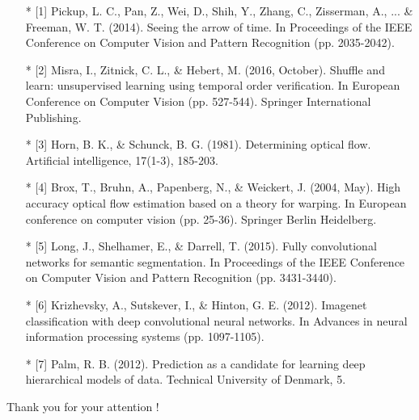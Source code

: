 \documentclass[10pt,a4paper]{report}
\begin{document}
		\scriptsize{
		\begin{itemize}
			
			\item[*] [1] Pickup, L. C., Pan, Z., Wei, D., Shih, Y., Zhang, C., Zisserman, A., ... \& Freeman, W. T. (2014). Seeing the arrow of time. In Proceedings of the IEEE Conference on Computer Vision and Pattern Recognition (pp. 2035-2042).
			
			\item[*] [2] Misra, I., Zitnick, C. L., \& Hebert, M. (2016, October). Shuffle and learn: unsupervised learning using temporal order verification. In European Conference on Computer Vision (pp. 527-544). Springer International Publishing.
			
			\item[*] [3] Horn, B. K., \& Schunck, B. G. (1981). Determining optical flow. Artificial intelligence, 17(1-3), 185-203.
			
			\item[*] [4] Brox, T., Bruhn, A., Papenberg, N., \& Weickert, J. (2004, May). High accuracy optical flow estimation based on a theory for warping. In European conference on computer vision (pp. 25-36). Springer Berlin Heidelberg.
			
			\item[*] [5] Long, J., Shelhamer, E., \& Darrell, T. (2015). Fully convolutional networks for semantic segmentation. In Proceedings of the IEEE Conference on Computer Vision and Pattern Recognition (pp. 3431-3440).
			
			\item[*] [6] Krizhevsky, A., Sutskever, I., \& Hinton, G. E. (2012). Imagenet classification with deep convolutional neural networks. In Advances in neural information processing systems (pp. 1097-1105).
			
			\item[*] [7] Palm, R. B. (2012). Prediction as a candidate for learning deep hierarchical models of data. Technical University of Denmark, 5.
			
		\end{itemize}
	}
	
	Thank you for your attention !
	
\end{document}
